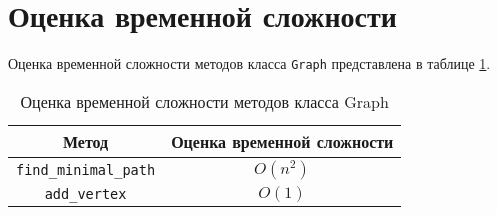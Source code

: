 \section{Оценка временной сложности}

Оценка временной сложности методов класса \verb|Graph|
представлена в таблице \ref{tab:complexity}.

\begin{table}[H]
    \centering
    \begin{tabular}{|c|c|}
        \hline
        Метод & Оценка временной сложности \\
        \hline
        \verb|find_minimal_path| & $ O(n^2) $ \\
        \hline
        \verb|add_vertex| & $ O(1) $ \\
        \hline
    \end{tabular}
    \caption{Оценка временной сложности методов класса Graph}
    \label{tab:complexity}
\end{table}